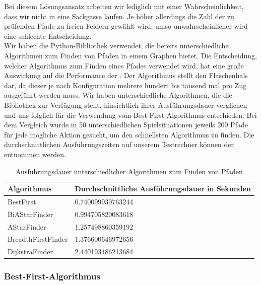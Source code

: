 Bei diesem Lösungsansatz arbeiten wir lediglich mit einer Wahrscheinlichkeit, dass wir nicht in eine Sackgasse laufen.
Je höher allerdings die Zahl der zu prüfenden Pfade zu freien Feldern gewählt wird, umso unwahrscheinlicher wird eine
schlechte Entscheidung. \\

Wir haben die Python-Bibliothek   verwendet, die bereits unterschiedliche
Algorithmen zum Finden von Pfaden in einem Graphen bietet.
Die Entscheidung, welcher Algorithmus zum Finden eines Pfades verwendet wird, hat eine große Auswirkung auf die
Performance der .
Der Algorithmus stellt den Flaschenhals dar, da dieser je nach Konfiguration mehrere hundert bis tausend mal pro
Zug ausgeführt werden muss.
Wir haben unterschiedliche Algorithmen, die die Bibliothek zur Verfügung stellt, hinsichtlich ihrer Ausführungsdauer
verglichen und uns folglich für die Verwendung vom Best-First-Algorithmus entschieden.
Bei dem Vergleich wurde in 50 unterschiedlichen Spielsituationen jeweils 200 Pfade für jede mögliche Aktion gesucht, um
den schnellsten Algorithmus zu finden.
Die durchschnittlichen Ausführungszeiten auf unserem Testrechner können der
 entnommen werden.

\begin{table}[htb]
    \centering
    \begin{tabular}{|l|l|}
        \hline
            \textbf{Algorithmus} & {\textbf{Durchschnittliche Ausführungsdauer in Sekunden}} \\ \hline
            BestFirst 		    & 0.740099930763244 \\ \hline
            BiAStarFinder 		& 0.994705820083618 \\ \hline
            AStarFinder 		& 1.257498860359192 \\ \hline
            BreadthFirstFinder  & 1.376600646972656 \\ \hline
            DijkstraFinder		& 2.440193486213684 \\ \hline
    \end{tabular}
    \caption{Ausführungsdauer unterschiedlicher Algorithmen zum Finden von Pfaden}
    \label{tab:ausfuehrungsdauer-pfadalgorithmen}
\end{table}

\subsubsection*{Best-First-Algorithmus}
\label{subsubsec:best-first-algorithm}

